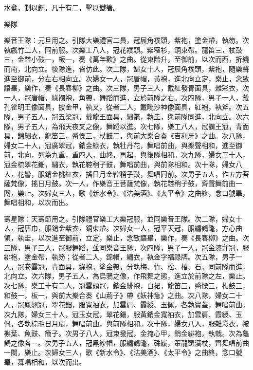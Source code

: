 \begin{pinyinscope}
 水盞，制以銅，凡十有二，擊以鐵箸。



 樂隊



 樂音王隊：元旦用之。引隊大樂禮官二員，冠展角襆頭，紫袍，塗金帶，執笏。次執戲竹二人，同前服。次樂工八人，冠花襆頭。紫窄衫，銅束帶。龍笛三，杖鼓三，金鞚小鼓一，板一，奏《萬年歡》之曲。從東階升，至御前，以次而西，折繞而南，北向立。後隊進，皆仿此。次二隊，婦女十人，冠展角襆頭，紫袍，隨樂聲進至御前，分左右相向立。次婦女一人，冠唐帽，黃袍，進北向立定，樂止，念致語畢，樂作，奏《長春柳》之曲。次三隊，男子三人，戴紅發青面具，雜彩衣，次一人，冠唐帽，綠襴袍，角帶，舞蹈而進，立於前隊之右。次四隊，男子一人，戴孔雀明王像面具，披金甲，執叉，從者二人，戴毗沙神像面具，紅袍，執斧。次五隊，男子五人，冠五梁冠，戴龍王面具，繡氅，執圭，與前隊同進，北向立。次六隊，男子五人，為飛天夜叉之像，舞蹈以進。次七隊，樂工八人，冠霸王冠，青面具，錦繡衣，龍笛三，觱慄三，杖鼓二，與前大樂合奏《吉利牙》之曲。次八隊，婦女二十人，冠廣翠冠，銷金綠衣，執牡丹花，舞唱前曲，與樂聲相和，進至御前，北向，列為九重，重四人，曲終，再起，與後隊相和。次九隊，婦女二十人，冠金梳翠花鈿，繡衣，執花鞚稍子鼓，舞唱前曲，與前隊相和。次十隊，婦女八人，花髻，服銷金桃紅衣，搖日月金鞚稍子鼓，舞唱同前。次男子五人，作五方菩薩梵像，搖日月鼓。次一人，作樂音王菩薩梵像，執花鞚稍子鼓，齊聲舞前曲一闋，樂止。次婦女三人，歌《新水令》、《沽美酒》、《太平令》之曲終，念口號畢，舞唱相和，以次而出。



 壽星隊：天壽節用之。引隊禮官樂工大樂冠服，並同樂音王隊。次二隊，婦女十人，冠唐巾，服銷金紫衣，銅束帶。次婦女一人，冠平天冠，服繡鶴氅，方心曲領，執圭，以次進至御前，立定，樂止，念致語畢，樂作，奏《長春柳》之曲。次三隊，男子三人，冠服舞蹈，並同樂音王隊。次四隊，男子一人，冠金漆弁冠，服緋袍，塗金帶，執笏；從者二人，錦帽，繡衣，執金字福祿牌。次五隊，男子一人，冠卷雲冠，青面具，綠袍，塗金帶，分執梅、竹、松、椿、石，同前隊而進，北向立。次六隊，男子五人，為烏鴉之像，作飛舞之態，進立於前隊之左，樂止。次七隊，樂工十有二人，冠雲頭冠，銷金緋袍，白裙，龍笛三，觱慄三，札鼓三，和鼓一，板一，與前大樂合奏《山荊子》帶《妖神急》之曲。次八隊，婦女二十人，冠鳳翹冠，翠花鈿，服寬袖衣，加雲肩、霞綬、玉佩，各執寶蓋，舞唱前曲。次九隊，婦女三十人，冠玉女冠，翠花鈿，服黃銷金寬袖衣，加雲肩、霞綬、玉佩，各執棕毛日月扇，舞唱前曲，與前隊相和。次十隊，婦女八人，服雜彩衣，被槲葉、魚鼓、簡子。次男子八人，冠束發冠，金掩心甲，銷金緋袍，執戟。次為龜鶴之像各一。次男子五人，冠黑紗帽，服繡鶴氅，硃履，策龍頭濆杖，齊舞唱前曲一闋，樂止。次婦女三人，歌《新水令》、《沽美酒》、《太平令》之曲終，念口號畢，舞唱相和，以次而出。




\end{pinyinscope}

